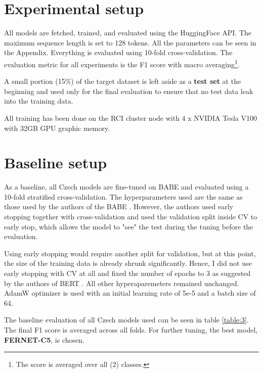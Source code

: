 \section{Experimental setup}
All models are fetched, trained, and evaluated using the HuggingFace API. The maximum sequence length is set to 128 tokens. All the parameters can be seen in the Appendix.
Everything is evaluated using 10-fold cross-validation. The evaluation metric for all experiments is the F1 score with macro averaging\footnote{The score is averaged over all (2) classes.}. 

A small portion (15\%) of the target dataset is left aside as a \textbf{test set} at the beginning and used only for the final evaluation to ensure that no test data leak into the training data.

All training has been done on the RCI cluster node with 4 x NVIDIA Tesla V100 with 32GB GPU graphic memory.





 \section{Baseline setup}
 As a baseline, all Czech models are fine-tuned on BABE and evaluated using a 10-fold stratified cross-validation. The hyperparameters used are the same as those used by the authors of the BABE \cite{Spinde2021MBIC}. However, the authors used early stopping together with cross-validation and used the validation split inside CV to early stop, which allows the model to "see" the test during the tuning before the evaluation. 
 
 Using early stopping would require another split for validation, but at this point, the size of the training data is already shrunk significantly. Hence, I did not use early stopping with CV at all and fixed the number of epochs to 3 as suggested by the authors of BERT \cite{devlin2019bert} . 
 All other hyperaparemeters remained unchanged. AdamW optimizer is used with an initial learning rate of 5e-5 and a batch size of 64.
 
 The baseline evaluation of all Czech models used can be seen in table \ref{table:3}. The final F1 score is averaged across all folds. For further tuning, the best model, \textbf{FERNET-C5}, is chosen.
 

 
 

 
 
 
 
